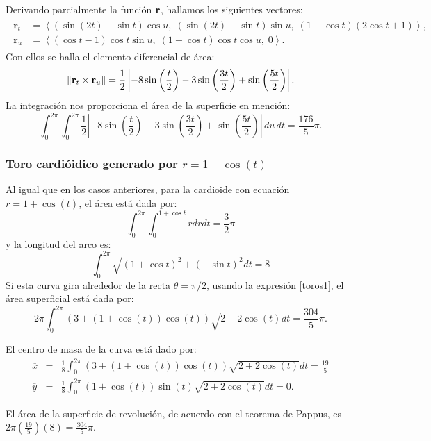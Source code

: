 Derivando parcialmente la función ${\bf r}$, hallamos los siguientes vectores:
\begin{gather*}
\begin{aligned}
\mathbf{r}_{t} &= \left\langle (\sin(2t) - \sin t)\cos u,\; (\sin(2t) - \sin t)\sin u,\; (1 - \cos t)(2\cos t + 1) \right\rangle,\\
{\mathbf r}_{u} &= \left\langle (\cos t - 1)\cos t \sin u,\; (1 - \cos t)\cos t \cos u,\; 0 \right\rangle.
\end{aligned}
\end{gather*}
Con ellos se halla el elemento diferencial de área:
\[
\left\| {\bf r}_{t} \times {\bf r}_{u} \right\| = \frac{1}{2} \left| -8\sin\left( \frac{t}{2} \right) - 3\sin\left( \frac{3t}{2} \right) + \sin\left( \frac{5t}{2} \right) \right|.
\]
La integración nos proporciona el área de la superficie en mención:
\[
\int_{0}^{2\pi} \int_{0}^{2\pi} \frac{1}{2} \left| -8\sin\left( \frac{t}{2} \right) - 3\sin\left( \frac{3t}{2} \right) + \sin\left( \frac{5t}{2} \right) \right| \, du \, dt = \frac{176}{5}\pi.
\]

\subsubsection{Toro cardióidico generado por \texorpdfstring{$r=1+\cos(t)$}{r=1+cos(t)}}
Al igual que en los casos anteriores, para la cardioide con ecuación
$r=1+\cos (t) $, el área está dada por:
\[\int_{0}^{2\pi }\int_{0}^{1+\cos t}rdrdt= \frac{3}{2}\pi\]
y la longitud del arco es:
\[\int_{0}^{2\pi }\sqrt{\left( 1+\cos t\right) ^{2}+\left( -\sin t\right) ^{2}}dt= 8\]
Si esta curva gira alrededor de la recta $\theta= \pi/2$, usando la expresión \ref{toros1},
el área superficial está dada por:
\[2\pi \int_{0}^{2\pi }\left( 3+\left( 1+\cos \left( t\right) \right) \cos
\left( t\right) \right) \sqrt{2+2\cos \left( t\right) }dt= \frac{304}{5}\pi.\]

El centro de masa de la curva está dado por:
\begin{eqnarray*}
\overline{x} &=& \frac{1}{8}\int_{0}^{2\pi }\left( 3+\left( 1+\cos \left(
t\right) \right) \cos \left( t\right) \right) \sqrt{2+2\cos \left( t\right) }%
dt= \frac{19}{5} \\
\overline{y} &=& \frac{1}{8}\int_{0}^{2\pi }\left( 1+\cos \left( t\right)
\right) \sin \left( t\right) \sqrt{2+2\cos \left( t\right) }dt= 0.
\end{eqnarray*}

El área de la superficie de revolución, de acuerdo con el teorema de Pappus, es  $2\pi \left( \frac{19}{5}\right) \left( 8\right) = \frac{304}{5}\pi. $

